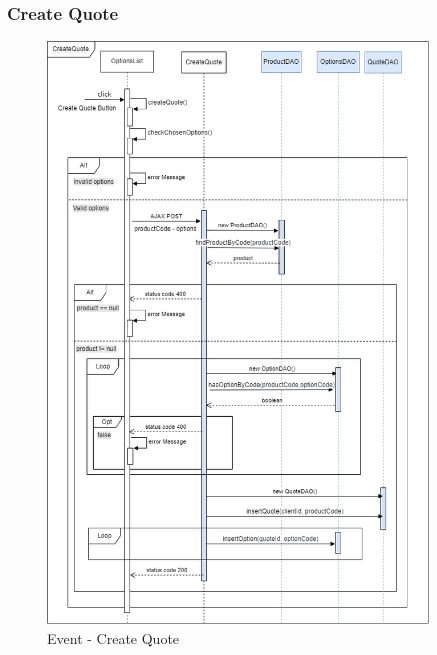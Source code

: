 \documentclass[a4paper, 12pt]{article}
\begin{document}
\subsubsection{Create Quote}
\begin{figure}[h!]
	\centering
	\includegraphics[width=0.9\textwidth]{RIA_images/CreateQuote.png}
	\caption{Event - Create Quote}
	\label{figure:CreateQuoteRIA}
\end{figure}
\newpage
\end{document}
